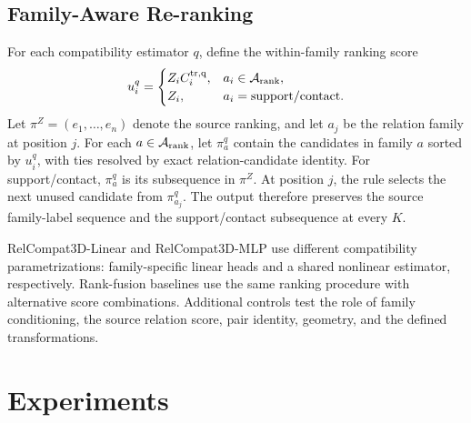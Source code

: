\subsection{Family-Aware Re-ranking}
For each compatibility estimator $q$, define the within-family ranking score
\begin{equation}
u_i^q=\begin{cases}
Z_iC_i^{\rm tr,q}, & a_i\in\mathcal A_{\rm rank},\\
Z_i, & a_i=\mathrm{support/contact}.
\end{cases}
\end{equation}
Let $\pi^Z=(e_1,\ldots,e_n)$ denote the source ranking, and let $a_j$ be the relation family at position $j$. For each $a\in\mathcal A_{\rm rank}$, let $\pi_a^q$ contain the candidates in family $a$ sorted by $u_i^q$, with ties
resolved by exact relation-candidate identity. For support/contact, $\pi_a^q$ is its subsequence in $\pi^Z$. At position $j$, the rule selects the next unused candidate from $\pi_{a_j}^q$. The output therefore preserves the source family-label sequence and the support/contact subsequence at every $K$.

RelCompat3D-Linear and RelCompat3D-MLP use different compatibility parametrizations: family-specific linear heads and a shared nonlinear estimator, respectively. Rank-fusion baselines use the same ranking procedure with alternative score combinations. Additional controls test the role of family conditioning, the source relation score, pair identity, geometry, and the defined transformations. 


\section{Experiments}
